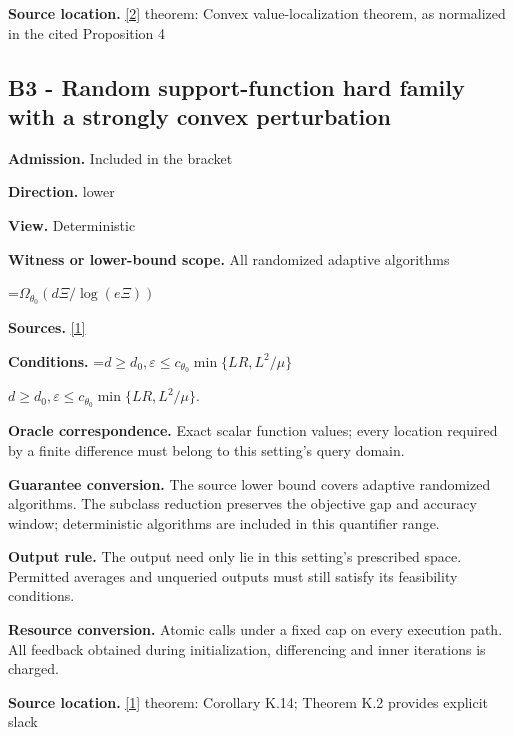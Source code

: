 \documentclass[10pt,a4paper]{article}
\newcommand{\AtlasMath}[1]{\par\begingroup\centering\setbox0=\hbox{$\displaystyle #1$}\ifdim\wd0>1.4\linewidth\typeout{ATLAS WIDE FORMULA: \the\wd0}\fi\ifdim\wd0>\linewidth\resizebox{\linewidth}{!}{\box0}\else\box0\fi\par\endgroup}
\newcommand{\AtlasInlineMath}[1]{\begingroup\setbox0=\hbox{$#1$}\ifdim\wd0>.4\linewidth\endgroup\AtlasMath{#1}\else\endgroup$#1$\fi}
\begin{document}
\textbf{Source location.} \href{https://www.mathnet.ru/php/archive.phtml?jrnid=mzm&option_lang=eng&paperid=1697&wshow=paper}{[2]} theorem: Convex value-localization theorem, as normalized in the cited Proposition 4



\subsection{B3 - Random support-function hard family with a strongly convex perturbation}


\textbf{Admission.} Included in the bracket



\textbf{Direction.} lower



\textbf{View.} Deterministic



\textbf{Witness or lower-bound scope.} All randomized adaptive algorithms



\AtlasMath{\Omega_{\theta_0}(d\Xi/\log(e\Xi))}


\textbf{Sources.} \href{https://arxiv.org/html/2610.00345v1}{[1]}



\textbf{Conditions.} \AtlasInlineMath{d\ge d_0,\varepsilon\le c_{\theta_0}\min\{LR,L^2/\mu\}}.



\textbf{Oracle correspondence.} Exact scalar function values; every location required by a finite difference must belong to this setting's query domain.



\textbf{Guarantee conversion.} The source lower bound covers adaptive randomized algorithms. The subclass reduction preserves the objective gap and accuracy window; deterministic algorithms are included in this quantifier range.



\textbf{Output rule.} The output need only lie in this setting's prescribed space. Permitted averages and unqueried outputs must still satisfy its feasibility conditions.



\textbf{Resource conversion.} Atomic calls under a fixed cap on every execution path. All feedback obtained during initialization, differencing and inner iterations is charged.



\textbf{Source location.} \href{https://arxiv.org/html/2610.00345v1}{[1]} theorem: Corollary K.14; Theorem K.2 provides explicit slack
\end{document}
